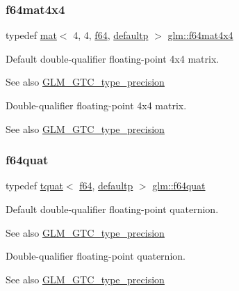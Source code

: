 \subsubsection{\texorpdfstring{f64mat4x4}{f64mat4x4}}
{\footnotesize\ttfamily typedef \hyperlink{structglm_1_1mat}{mat}$<$ 4, 4, \hyperlink{group__gtc__type__precision_ga2bba392e555124b36cde6abba349bab3}{f64}, \hyperlink{namespaceglm_a36ed105b07c7746804d7fdc7cc90ff25a9d21ccd8b5a009ec7eb7677befc3bf51}{defaultp} $>$ \hyperlink{group__gtc__type__precision_ga5fc21633b1546e4599609c47b4c8dac4}{glm\+::f64mat4x4}}

Default double-\/qualifier floating-\/point 4x4 matrix. \begin{DoxySeeAlso}{See also}
\hyperlink{group__gtc__type__precision}{G\+L\+M\+\_\+\+G\+T\+C\+\_\+type\+\_\+precision}
\end{DoxySeeAlso}
Double-\/qualifier floating-\/point 4x4 matrix. \begin{DoxySeeAlso}{See also}
\hyperlink{group__gtc__type__precision}{G\+L\+M\+\_\+\+G\+T\+C\+\_\+type\+\_\+precision} 
\end{DoxySeeAlso}
\mbox{\label{group__gtc__type__precision_ga5b54d7b36fbee5e271f73e6ed74e7172}} 
\subsubsection{\texorpdfstring{f64quat}{f64quat}}
{\footnotesize\ttfamily typedef \hyperlink{structglm_1_1tquat}{tquat}$<$ \hyperlink{group__gtc__type__precision_ga2bba392e555124b36cde6abba349bab3}{f64}, \hyperlink{namespaceglm_a36ed105b07c7746804d7fdc7cc90ff25a9d21ccd8b5a009ec7eb7677befc3bf51}{defaultp} $>$ \hyperlink{group__gtc__type__precision_ga5b54d7b36fbee5e271f73e6ed74e7172}{glm\+::f64quat}}

Default double-\/qualifier floating-\/point quaternion. \begin{DoxySeeAlso}{See also}
\hyperlink{group__gtc__type__precision}{G\+L\+M\+\_\+\+G\+T\+C\+\_\+type\+\_\+precision}
\end{DoxySeeAlso}
Double-\/qualifier floating-\/point quaternion. \begin{DoxySeeAlso}{See also}
\hyperlink{group__gtc__type__precision}{G\+L\+M\+\_\+\+G\+T\+C\+\_\+type\+\_\+precision} 
\end{DoxySeeAlso}
\mbox{\label{group__gtc__type__precision_ga6478d0530433bb907956a46b2cd99161}} 
